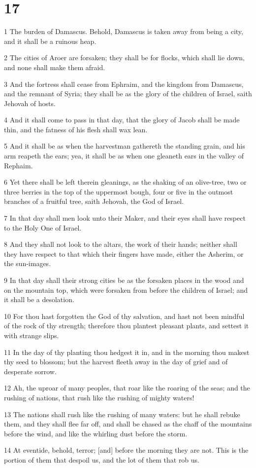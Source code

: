 \chapter{17}

\par 1 The burden of Damascus. Behold, Damascus is taken away from being a city, and it shall be a ruinous heap.
\par 2 The cities of Aroer are forsaken; they shall be for flocks, which shall lie down, and none shall make them afraid.
\par 3 And the fortress shall cease from Ephraim, and the kingdom from Damascus, and the remnant of Syria; they shall be as the glory of the children of Israel, saith Jehovah of hosts.
\par 4 And it shall come to pass in that day, that the glory of Jacob shall be made thin, and the fatness of his flesh shall wax lean.
\par 5 And it shall be as when the harvestman gathereth the standing grain, and his arm reapeth the ears; yea, it shall be as when one gleaneth ears in the valley of Rephaim.
\par 6 Yet there shall be left therein gleanings, as the shaking of an olive-tree, two or three berries in the top of the uppermost bough, four or five in the outmost branches of a fruitful tree, saith Jehovah, the God of Israel.
\par 7 In that day shall men look unto their Maker, and their eyes shall have respect to the Holy One of Israel.
\par 8 And they shall not look to the altars, the work of their hands; neither shall they have respect to that which their fingers have made, either the Asherim, or the sun-images.
\par 9 In that day shall their strong cities be as the forsaken places in the wood and on the mountain top, which were forsaken from before the children of Israel; and it shall be a desolation.
\par 10 For thou hast forgotten the God of thy salvation, and hast not been mindful of the rock of thy strength; therefore thou plantest pleasant plants, and settest it with strange slips.
\par 11 In the day of thy planting thou hedgest it in, and in the morning thou makest thy seed to blossom; but the harvest fleeth away in the day of grief and of desperate sorrow.
\par 12 Ah, the uproar of many peoples, that roar like the roaring of the seas; and the rushing of nations, that rush like the rushing of mighty waters!
\par 13 The nations shall rush like the rushing of many waters: but he shall rebuke them, and they shall flee far off, and shall be chased as the chaff of the mountains before the wind, and like the whirling dust before the storm.
\par 14 At eventide, behold, terror; [and] before the morning they are not. This is the portion of them that despoil us, and the lot of them that rob us.

